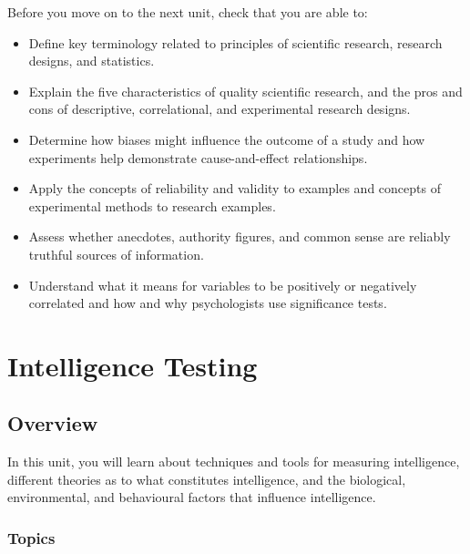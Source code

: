 \documentclass[
]{book}
\providecommand{\tightlist}{%
  \setlength{\itemsep}{0pt}\setlength{\parskip}{0pt}}
\begin{document}
\begin{progress}
Before you move on to the next unit, check that you are able to:

\begin{itemize}
\tightlist
\item
  Define key terminology related to principles of scientific research, research designs, and statistics.\\
\item
  Explain the five characteristics of quality scientific research, and the pros and cons of descriptive, correlational, and experimental research designs.\\
\item
  Determine how biases might influence the outcome of a study and how experiments help demonstrate cause-and-effect relationships.\\
\item
  Apply the concepts of reliability and validity to examples and concepts of experimental methods to research examples.\\
\item
  Assess whether anecdotes, authority figures, and common sense are reliably truthful sources of information.\\
\item
  Understand what it means for variables to be positively or negatively correlated and how and why psychologists use significance tests.
\end{itemize}
\end{progress}

\hypertarget{intelligence-testing}{%
\chapter{Intelligence Testing}\label{intelligence-testing}}

\hypertarget{overview-1}{%
\section*{Overview}\label{overview-1}}

In this unit, you will learn about techniques and tools for measuring intelligence, different theories as to what constitutes intelligence, and the biological, environmental, and behavioural factors that influence intelligence.

\hypertarget{topics-1}{%
\subsection*{Topics}\label{topics-1}}
\end{document}
